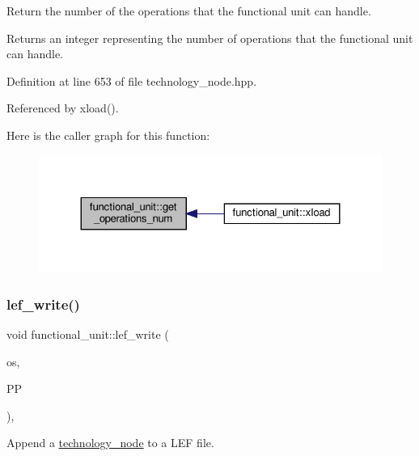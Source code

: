 Return the number of the operations that the functional unit can handle. 

\begin{DoxyReturn}{Returns}
an integer representing the number of operations that the functional unit can handle. 
\end{DoxyReturn}


Definition at line 653 of file technology\+\_\+node.\+hpp.



Referenced by xload().

Here is the caller graph for this function\+:
\nopagebreak
\begin{figure}[H]
\begin{center}
\leavevmode
\includegraphics[width=324pt]{d8/dd6/structfunctional__unit_a39929de3fd82d1665539576d738dfff0_icgraph}
\end{center}
\end{figure}
\mbox{\label{structfunctional__unit_a3e77b0b684c72195d55d1aa2144641c1}} 
\subsubsection{\texorpdfstring{lef\+\_\+write()}{lef\_write()}}
{\footnotesize\ttfamily void functional\+\_\+unit\+::lef\+\_\+write (\begin{DoxyParamCaption}\item[{std\+::ofstream \&}]{os,  }\item[{const \hyperlink{simple__indent_8hpp_ad85cff64e49d5dbf5cefe96f411c720e}{simple\+\_\+indent\+Ref}}]{PP }\end{DoxyParamCaption})\hspace{0.3cm}{\ttfamily [override]}, {\ttfamily [virtual]}}



Append a \hyperlink{structtechnology__node}{technology\+\_\+node} to a L\+EF file. 



